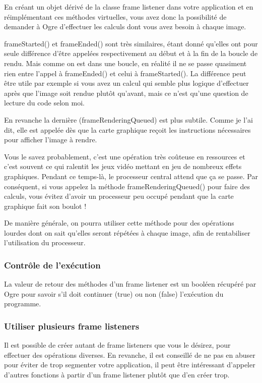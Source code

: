 En créant un objet dérivé de la classe frame listener dans votre application et en réimplémentant ces méthodes virtuelles, vous avez donc la possibilité de demander à Ogre d'effectuer les calculs dont vous avez besoin à chaque image.



frameStarted() et frameEnded() sont très similaires, étant donné qu'elles ont pour seule différence d'être appelées respectivement au début et à la fin de la boucle de rendu. Mais comme on est dans une boucle, en réalité il ne se passe quasiment rien entre l'appel à frameEnded() et celui à frameStarted(). La différence peut être utile par exemple si vous avez un calcul qui semble plus logique d'effectuer après que l'image soit rendue plutôt qu'avant, mais ce n'est qu'une question de lecture du code selon moi.


En revanche la dernière (frameRenderingQueued) est plus subtile. Comme je l'ai dit, elle est appelée dès que la carte graphique reçoit les instructions nécessaires pour afficher l'image à rendre.


Vous le savez probablement, c'est une opération très co\^uteuse en ressources et c'est souvent ce qui ralentit les jeux vidéo mettant en jeu de nombreux effets graphiques. Pendant ce temps-là, le processeur central attend que ça se passe. Par conséquent, si vous appelez la méthode frameRenderingQueued() pour faire des calculs, vous évitez d'avoir un processeur peu occupé pendant que la carte graphique fait son boulot !

De manière générale, on pourra utiliser cette méthode pour des opérations lourdes dont on sait qu'elles seront répétées à chaque image, afin de rentabiliser l'utilisation du processeur.




\subsubsection{Contrôle de l'exécution}

La valeur de retour des méthodes d'un frame listener est un booléen récupéré par Ogre pour savoir s'il doit continuer (true) ou non (false) l'exécution du programme.



\subsubsection{Utiliser plusieurs frame listeners}

Il est possible de créer autant de frame listeners que vous le désirez, pour effectuer des opérations diverses. En revanche, il est conseillé de ne pas en abuser pour éviter de trop segmenter votre application, il peut être intéressant d'appeler d'autres fonctions à partir d'un frame listener plutôt que d'en créer trop.


